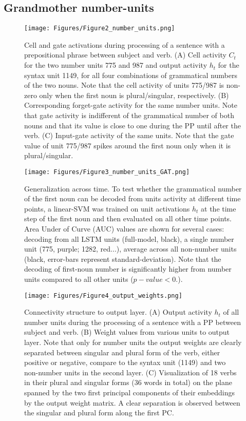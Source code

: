 \subsection{Grandmother number-units}
\lipsum[1]

\begin{figure}[t]
\texttt{[image: Figures/Figure2\_number\_units.png]}
\caption{Cell and gate activations during processing of a sentence with a prepositional phrase between subject and verb. (A) Cell activity $C_t$ for the two number units 775 and 987 and output activity $h_t$ for the syntax unit 1149, for all four combinations of grammatical numbers of the two nouns. Note that the cell activity of units 775/987 is non-zero only when the first noun is plural/singular, respectively. (B) Corresponding forget-gate activity for the same number units. Note that gate activity is indifferent of the grammatical number of both nouns and that its value is close to one during the PP until after the verb. (C) Input-gate activity of the same units. Note that the gate value of unit 775/987 spikes around the first noun only when it is plural/singular.}
\end{figure}

\lipsum[1]

\begin{figure}
\centering
\texttt{[image: Figures/Figure3\_number\_units\_GAT.png]}
\caption{Generalization across time. To test whether the grammatical number of the first noun can be decoded from units activity at different time points, a linear-SVM was trained on unit activations $h_t$ at the time step of the first noun and then evaluated on all other time points. Area Under of Curve (AUC) values are shown for several cases: decoding from all LSTM units (full-model, black), a single number unit (775, purple; 1282, red...), average across all non-number units (black, error-bars represent standard-deviation). Note that the decoding of first-noun number is significantly higher from number units compared to all other units ($p-value<0.$).}
\end{figure}

\lipsum[1]

\begin{figure*}[t]
\centering
\texttt{[image: Figures/Figure4\_output\_weights.png]}
\caption{Connectivity structure to output layer. (A) Output activity $h_t$ of all number units during the processing of a sentence with a PP between subject and verb. (B) Weight values from various units to output layer. Note that only for number units the output weights are clearly separated between singular and plural form of the verb, either positive or negative, compare to the syntax unit (1149) and two non-number units in the second layer. (C) Visualization of 18 verbs in their plural and singular forms (36 words in total) on the plane spanned by the two first principal components of their embeddings by the output weight matrix. A clear separation is observed between the singular and plural form along the first PC.}
\end{figure*}

